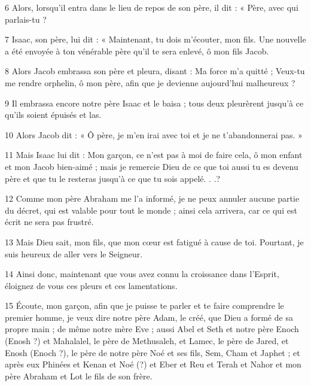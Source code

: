 \par 6 Alors, lorsqu'il entra dans le lieu de repos de son père, il dit : « Père, avec qui parlais-tu ?

\par 7 Isaac, son père, lui dit : « Maintenant, tu dois m'écouter, mon fils. Une nouvelle a été envoyée à ton vénérable père qu'il te sera enlevé, ô mon fils Jacob.

\par 8 Alors Jacob embrassa son père et pleura, disant : Ma force m'a quitté ; Veux-tu me rendre orphelin, ô mon père, afin que je devienne aujourd'hui malheureux ?

\par 9 Il embrassa encore notre père Isaac et le baisa ; tous deux pleurèrent jusqu'à ce qu'ils soient épuisés et las.

\par 10 Alors Jacob dit : « Ô père, je m'en irai avec toi et je ne t'abandonnerai pas. »

\par 11 Mais Isaac lui dit : Mon garçon, ce n'est pas à moi de faire cela, ô mon enfant et mon Jacob bien-aimé ; mais je remercie Dieu de ce que toi aussi tu es devenu père et que tu le resteras jusqu'à ce que tu sois appelé. . .?

\par 12 Comme mon père Abraham me l'a informé, je ne peux annuler aucune partie du décret, qui est valable pour tout le monde ; ainsi cela arrivera, car ce qui est écrit ne sera pas frustré.

\par 13 Mais Dieu sait, mon fils, que mon cœur est fatigué à cause de toi. Pourtant, je suis heureux de aller vers le Seigneur.

\par 14 Ainsi donc, maintenant que vous avez connu la croissance dans l'Esprit, éloignez de vous ces pleurs et ces lamentations.

\par 15 Écoute, mon garçon, afin que je puisse te parler et te faire comprendre le premier homme, je veux dire notre père Adam, le créé, que Dieu a formé de sa propre main ; de même notre mère Eve ; aussi Abel et Seth et notre père Enoch (Enosh ?) et Mahalalel, le père de Methusaleh, et Lamec, le père de Jared, et Enosh (Enoch ?), le père de notre père Noé et ses fils, Sem, Cham et Japhet ; et après eux Phinées et Kenan et Noé (?) et Eber et Reu et Terah et Nahor et mon père Abraham et Lot le fils de son frère.

